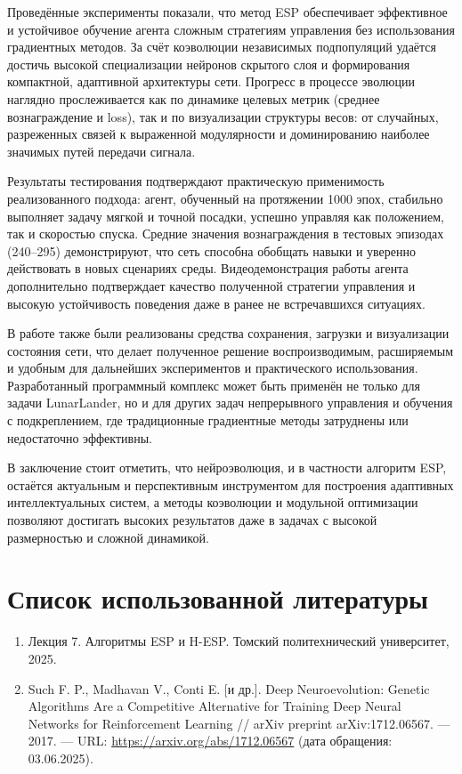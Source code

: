 \documentclass[a4paper,12pt]{article}
\begin{document}
Проведённые эксперименты показали, что метод ESP обеспечивает эффективное и устойчивое обучение агента сложным стратегиям управления без использования градиентных методов. За счёт коэволюции независимых подпопуляций удаётся достичь высокой специализации нейронов скрытого слоя и формирования компактной, адаптивной архитектуры сети. Прогресс в процессе эволюции наглядно прослеживается как по динамике целевых метрик (среднее вознаграждение и loss), так и по визуализации структуры весов: от случайных, разреженных связей к выраженной модулярности и доминированию наиболее значимых путей передачи сигнала.

Результаты тестирования подтверждают практическую применимость реализованного подхода: агент, обученный на протяжении 1000 эпох, стабильно выполняет задачу мягкой и точной посадки, успешно управляя как положением, так и скоростью спуска. Средние значения вознаграждения в тестовых эпизодах (240--295) демонстрируют, что сеть способна обобщать навыки и уверенно действовать в новых сценариях среды. Видеодемонстрация работы агента дополнительно подтверждает качество полученной стратегии управления и высокую устойчивость поведения даже в ранее не встречавшихся ситуациях.

В работе также были реализованы средства сохранения, загрузки и визуализации состояния сети, что делает полученное решение воспроизводимым, расширяемым и удобным для дальнейших экспериментов и практического использования. Разработанный программный комплекс может быть применён не только для задачи LunarLander, но и для других задач непрерывного управления и обучения с подкреплением, где традиционные градиентные методы затруднены или недостаточно эффективны.

В заключение стоит отметить, что нейроэволюция, и в частности алгоритм ESP, остаётся актуальным и перспективным инструментом для построения адаптивных интеллектуальных систем, а методы коэволюции и модульной оптимизации позволяют достигать высоких результатов даже в задачах с высокой размерностью и сложной динамикой.
\newpage
\section*{Список использованной литературы}
\begin{enumerate}
    \item Лекция 7. Алгоритмы ESP и H-ESP. Томский политехнический университет, 2025.
    \item Such F. P., Madhavan V., Conti E. [и др.]. Deep Neuroevolution: Genetic Algorithms Are a Competitive Alternative for Training Deep Neural Networks for Reinforcement Learning // arXiv preprint arXiv:1712.06567. — 2017. — URL: \url{https://arxiv.org/abs/1712.06567} (дата обращения: 03.06.2025). 
\end{enumerate}
\end{document}
